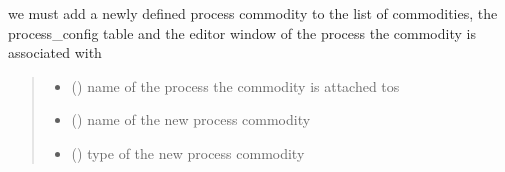 \documentclass[letterpaper,10pt,english]{sphinxmanual}
\begin{document}
\begin{fulllineitems}
\label{\detokenize{docs_gui/js_api/urbs_editor/process_editor:createNewProcessCommodity}}
\pysigstartsignatures
{}
\pysigstopsignatures
\sphinxAtStartPar
we must add a newly defined process commodity to the list of commodities, the process\_config table and the editor window of the process the commodity is associated with
\begin{quote}\begin{description}
\begin{itemize}
\item {} 
\sphinxAtStartPar
{} () \textendash{} name of the process the commodity is attached tos

\item {} 
\sphinxAtStartPar
{} () \textendash{} name of the new process commodity

\item {} 
\sphinxAtStartPar
{} () \textendash{} type of the new process commodity

\end{itemize}

\end{description}\end{quote}

\end{fulllineitems}

\end{document}
